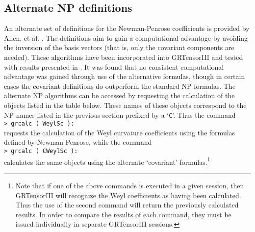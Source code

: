 \documentclass{article}
\begin{document}
\subsection*{Alternate NP definitions}\label{sec:altNP}
%
An alternate set of definitions for the Newman-Penrose coefficients is
provided by Allen, et al. \cite{allen/etal:1994}. The definitions
aim to gain a computational advantage by avoiding the inversion of
the basis vectors (that is, only the covariant components are needed).
These algorithms have been incorporated into GRTensorIII and tested
with results presented in \cite{pmsl96}. It was found that no consistent
computational advantage was gained through use of the alternative
formulas, though in certain cases the covariant
definitions do outperform the standard NP formulas. The alternate
NP algorithms can be accessed by requesting the calculation of the
objects listed in the table below. These names of these objects correspond
to the NP names listed in the previous section prefixed by a `\texttt{C}'.
Thus the command\\

\noindent\texttt{> grcalc ( WeylSc ):}\\

\noindent requests the calculation of the Weyl curvature coefficients using
the formulas defined by Newman-Penrose, while the command\\

\noindent\texttt{> grcalc ( CWeylSc ):}\\

\noindent calculates the same objects using the alternate `covariant'
formulas.\footnote{Note that if one of the above commands is executed
in a given session, then GRTensorIII will recognize the Weyl
coefficients as having been calculated. Thus the use of the second
command will return the previously calculated results. In order to
compare the results of each command, they must be issued individually
in separate GRTensorIII sessions.}
\end{document}
